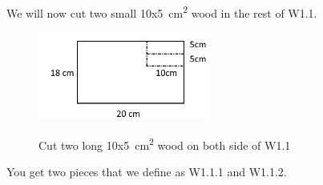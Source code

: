 \documentclass{subfiles}
\begin{document}
    We will now cut two small 10x5\SI{}{\square\centi\meter} wood in the rest of W1.1.
    \begin{figure}[h]
        \centering
        \includegraphics[width=0.5\textwidth]{Ressources/Cut_W1_1_3.png}
        \label{fig:Cut_W1_1_3}
        \caption{Cut two long 10x5\SI{}{\square\centi\meter} wood on both side of W1.1}
    \end{figure}
    You get two pieces that we define as W1.1.1 and W1.1.2.
\end{document}
